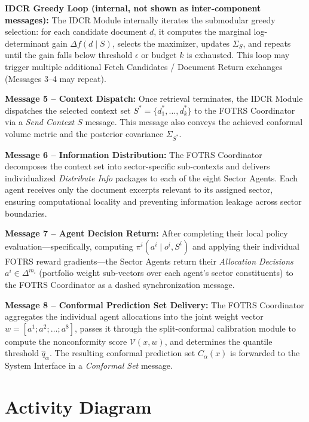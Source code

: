 \documentclass[12pt,a4paper,oneside]{report}
\theoremstyle{definition}
\theoremstyle{remark}
\begin{document}
\textbf{IDCR Greedy Loop (internal, not shown as inter-component messages):} The IDCR Module internally iterates the submodular greedy selection: for each candidate document $d$, it computes the marginal log-determinant gain $\Delta f(d \mid S)$, selects the maximizer, updates $\Sigma_S$, and repeats until the gain falls below threshold $\epsilon$ or budget $k$ is exhausted. This loop may trigger multiple additional Fetch Candidates / Document Return exchanges (Messages 3--4 may repeat).

\textbf{Message 5 -- Context Dispatch:} Once retrieval terminates, the IDCR Module dispatches the selected context set $S^* = \{d_1^*, \ldots, d_k^*\}$ to the FOTRS Coordinator via a \emph{Send Context $S$} message. This message also conveys the achieved conformal volume metric and the posterior covariance $\Sigma_{S^*}$.

\textbf{Message 6 -- Information Distribution:} The FOTRS Coordinator decomposes the context set into sector-specific sub-contexts and delivers individualized \emph{Distribute Info} packages to each of the eight Sector Agents. Each agent receives only the document excerpts relevant to its assigned sector, ensuring computational locality and preventing information leakage across sector boundaries.

\textbf{Message 7 -- Agent Decision Return:} After completing their local policy evaluation---specifically, computing $\pi^i(a^i \mid o^i, S^i)$ and applying their individual FOTRS reward gradients---the Sector Agents return their \emph{Allocation Decisions} $a^i \in \Delta^{m_i}$ (portfolio weight sub-vectors over each agent's sector constituents) to the FOTRS Coordinator as a dashed synchronization message.

\textbf{Message 8 -- Conformal Prediction Set Delivery:} The FOTRS Coordinator aggregates the individual agent allocations into the joint weight vector $w = [a^1; a^2; \ldots; a^8]$, passes it through the split-conformal calibration module to compute the nonconformity score $\mathcal{V}(x, w)$, and determines the quantile threshold $\hat{q}_\alpha$. The resulting conformal prediction set $C_\alpha(x)$ is forwarded to the System Interface in a \emph{Conformal Set} message.

\section{Activity Diagram}
\end{document}
